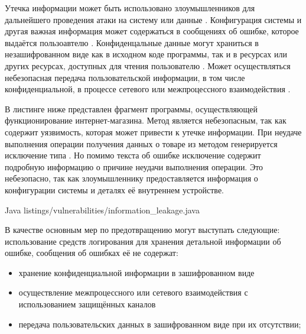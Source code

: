 

%
Утечка информации может быть использовано злоумышленников для дальнейшего проведения атаки на систему или данные . 
%
Конфигурация системы и другая важная информация  может содержаться в сообщениях об ошибке, которое выдаётся пользоавтелю . 
%
Конфиденцальные данные могут храниться в незашифрованном виде как в исходном коде программы, так и в ресурсах или других ресурсах, доступных для чтения пользователю . 
%
Может осуществляться небезопасная передача пользовательской  информации, в том числе конфиденциальной, в процессе сетевого или межпроцессного взаимодействия .

%
В листинге ниже представлен фрагмент программы, осуществляющей функционирование интернет-магазина. 
%
Метод  является небезопасным, так как содержит уязвимость, которая может привести к утечке информации.
%
При неудаче выполнения операции получения данных о товаре из  методом генерируется исключение типа . 
%
Но помимо текста об ошибке исключение содержит подробную информацию о причине неудачи выполнения операции. 
%
Это небезопасно, так как злоумышленнику предоставляется информация о конфигурации системы и деталях её внутреннем устройстве. 

	{Java}
	{listings/vulnerabilities/information_leakage.java}

%
В качестве основным мер по предотвращению могут выступать следующие: использование средств логирования для хранения детальной информации об ошибке, сообщения об ошибках её не содержат:
\begin{itemize}
	
	\item хранение конфиденциальной информации в зашифрованном виде
	
	\item осуществление межпроцессного или сетевого взаимодействия с использованием защищённых каналов
	
	\item передача пользовательских данных в зашифрованном виде при их отсутствии;
\end{itemize}

